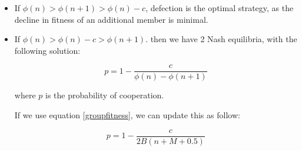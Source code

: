 \documentclass{article}
\begin{document}
\begin{itemize}
\item If $\phi(n) > \phi(n+1) > \phi(n)-c$, defection is the optimal strategy, as the decline in fitness of an additional member is minimal.

\item If $\phi(n) > \phi(n) -c  > \phi(n+1)$. then we have 2 Nash equilibria, with the following solution:


\begin{equation}
 p = 1-\frac{c}{\phi(n)-\phi(n+1)}
\end{equation}

where $p$ is the probability of cooperation.










If we use equation \ref{groupfitness}, we can update this as follow:

\begin{equation}
p = 1-\frac{c}{2B(n+M+0.5)}
\end{equation}




\end{itemize}
\end{document}
